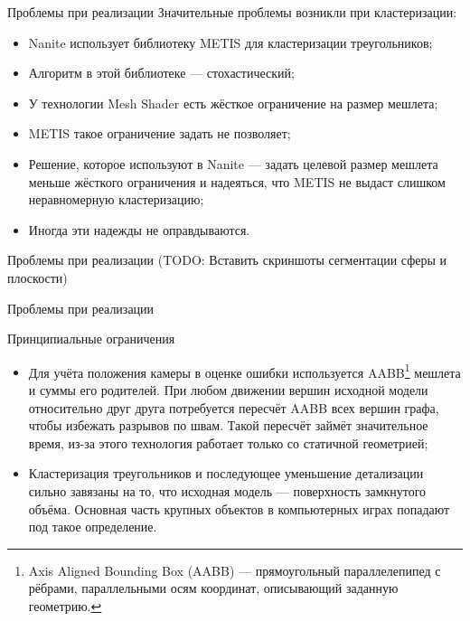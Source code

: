 \documentclass{beamer}
\begin{document}
    \begin{frame}{Проблемы при реализации}
        Значительные проблемы возникли при кластеризации:
        \begin{itemize}
            \item Nanite использует библиотеку METIS
            для кластеризации треугольников;
            \item Алгоритм в этой библиотеке --- стохастический;
            \item У технологии Mesh Shader есть жёсткое ограничение
            на размер мешлета;
            \item METIS такое ограничение задать не позволяет;
            \item Решение, которое используют в Nanite
            --- задать целевой размер мешлета меньше
            жёсткого ограничения и надеяться,
            что METIS не выдаст слишком неравномерную кластеризацию;
            \item Иногда эти надежды не оправдываются.
        \end{itemize}
    \end{frame}

    \begin{frame}{Проблемы при реализации}
        (TODO: Вставить скриншоты сегментации сферы и плоскости)
    \end{frame}

    \begin{frame}{Проблемы при реализации}

    \end{frame}

    \begin{frame}{Принципиальные ограничения}
        \begin{itemize}
            \item
            Для учёта положения камеры в оценке ошибки
            используется AABB\footnote{
                Axis Aligned Bounding Box (AABB) ---
                прямоугольный параллелепипед
                с рёбрами, параллельными осям координат,
                описывающий заданную геометрию.
            } мешлета и суммы его родителей.
            При любом движении вершин исходной модели
            относительно друг друга потребуется
            пересчёт AABB всех вершин графа,
            чтобы избежать разрывов по швам.
            Такой пересчёт займёт значительное время,
            из-за этого технология работает только со
            статичной геометрией;

            \item
            Кластеризация треугольников и последующее уменьшение
            детализации сильно завязаны на то,
            что исходная модель --- поверхность замкнутого объёма.
            Основная часть крупных объектов в компьютерных играх
            попадают под такое определение.
        \end{itemize}
    \end{frame}
\end{document}
